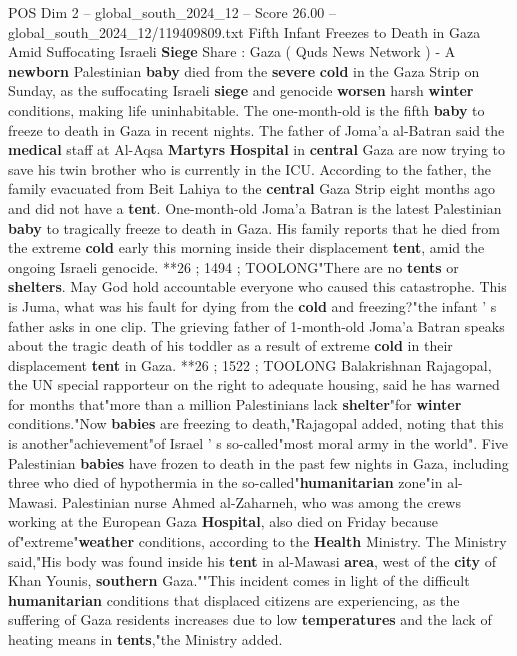 \begin{textsample}{POS Dim 2 – global\_south\_2024\_12 – Score 26.00 – global\_south\_2024\_12/119409809.txt}  \label{ex:f2_pos_070}
Fifth Infant Freezes to Death in Gaza Amid Suffocating Israeli \textbf{Siege} Share : Gaza ( Quds News Network ) - A \textbf{newborn} Palestinian \textbf{baby} died from the \textbf{severe} \textbf{cold} in the Gaza Strip on Sunday, as the suffocating Israeli \textbf{siege} and genocide \textbf{worsen} harsh \textbf{winter} conditions, making life uninhabitable.
The one-month-old is the fifth \textbf{baby} to freeze to death in Gaza in recent nights.
The father of Joma'a al-Batran said the \textbf{medical} staff at Al-Aqsa \textbf{Martyrs} \textbf{Hospital} in \textbf{central} Gaza are now trying to save his twin brother who is currently in the ICU.
According to the father, the family evacuated from Beit Lahiya to the \textbf{central} Gaza Strip eight months ago and did not have a \textbf{tent}.
One-month-old Joma'a Batran is the latest Palestinian \textbf{baby} to tragically freeze to death in Gaza.
His family reports that he died from the extreme \textbf{cold} early this morning inside their displacement \textbf{tent}, amid the ongoing Israeli genocide. **26 ; 1494 ; TOOLONG"There are no \textbf{tents} or \textbf{shelters}.
May God hold accountable everyone who caused this catastrophe.
This is Juma, what was his fault for dying from the \textbf{cold} and freezing?"the infant ' s father asks in one clip.
The grieving father of 1-month-old Joma'a Batran speaks about the tragic death of his toddler as a result of extreme \textbf{cold} in their displacement \textbf{tent} in Gaza. **26 ; 1522 ; TOOLONG Balakrishnan Rajagopal, the UN special rapporteur on the right to adequate housing, said he has warned for months that"more than a million Palestinians lack \textbf{shelter}"for \textbf{winter} conditions."Now \textbf{babies} are freezing to death,"Rajagopal added, noting that this is another"achievement"of Israel ' s so-called"most moral army in the world".
Five Palestinian \textbf{babies} have frozen to death in the past few nights in Gaza, including three who died of hypothermia in the so-called"\textbf{humanitarian} zone"in al-Mawasi.
Palestinian nurse Ahmed al-Zaharneh, who was among the crews working at the European Gaza \textbf{Hospital}, also died on Friday because of"extreme"\textbf{weather} conditions, according to the \textbf{Health} Ministry.
The Ministry said,"His body was found inside his \textbf{tent} in al-Mawasi \textbf{area}, west of the \textbf{city} of Khan Younis, \textbf{southern} Gaza.""This incident comes in light of the difficult \textbf{humanitarian} conditions that displaced citizens are experiencing, as the suffering of Gaza residents increases due to low \textbf{temperatures} and the lack of heating means in \textbf{tents},"the Ministry added.

\end{textsample}
